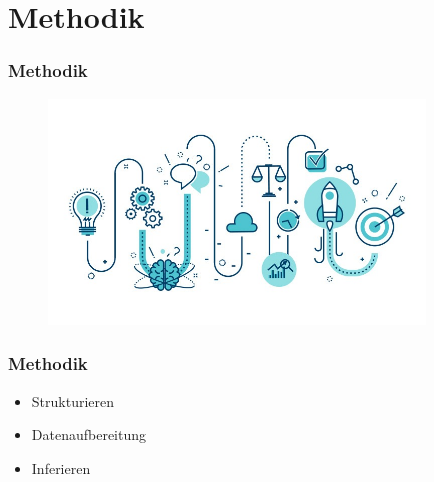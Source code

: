 \documentclass[12pt]{beamer}
\begin{document}
    \section{Methodik}
    \label{sec:methodik}
    \begin{frame}
        \frametitle{Methodik}

        \begin{figure}
            \centering
            \includegraphics[width=10cm]{../images/methodik.jpg}
        \end{figure}
    \end{frame}

    \begin{frame}
        \frametitle{Methodik}

        \begin{itemize}
            \setlength\itemsep{1em}
            \item<1-> Strukturieren
            \item<2-> Datenaufbereitung
            \item<3-> Inferieren
        \end{itemize}
    \end{frame}
\end{document}
